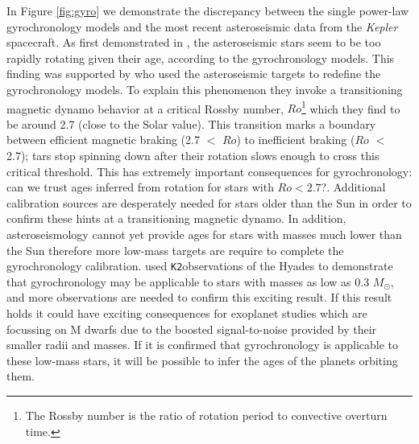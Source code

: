 \documentclass[12pt]{article}
\newcommand{\Kepler}{\textsl{Kepler}\xspace}
\newcommand{\ktwo}{{\tt K2}}
\begin{document}
In Figure \ref{fig:gyro} we demonstrate the discrepancy between the single
power-law gyrochronology models and the most recent asteroseismic data from
the \Kepler spacecraft.
As first demonstrated in \citet{angus2015}, the asteroseismic stars seem to be
too rapidly rotating given their age, according to the gyrochronology models.
This finding was supported by \citet{Vansaders2016} who used the \kepler
asteroseismic targets to redefine the gyrochronology models.
To explain this phenomenon they invoke a transitioning magnetic dynamo
behavior at a critical Rossby number, $Ro$\footnote{The Rossby number is the
ratio of rotation period to convective overturn time.} which they find to be
around 2.7 (close to the Solar value).
This transition marks a boundary between efficient magnetic braking (2.7 $<$
$Ro$) to inefficient braking ($Ro$ $<$ 2.7); tars stop spinning down after
their rotation slows enough to cross this critical threshold.
This has extremely important consequences for gyrochronology: can we trust
ages inferred from rotation for stars with $Ro < 2.7$?.
Additional calibration sources are desperately needed for stars older than the
Sun in order to confirm these hints at a transitioning magnetic dynamo.
In addition, asteroseismology cannot yet provide ages for stars with masses
much lower than the Sun therefore more low-mass targets are require to
complete the gyrochronology calibration.
\citet{Douglas2017} used \ktwo observations of the Hyades to demonstrate that
gyrochronology may be applicable to stars with masses as low as 0.3 $M_\odot$,
and more observations are needed to confirm this exciting result.
If this result holds it could have exciting consequences for exoplanet studies
which are focussing on M dwarfs due to the boosted signal-to-noise provided by
their smaller radii and masses.
If it is confirmed that gyrochronology is applicable to these low-mass stars,
it will be possible to infer the ages of the planets orbiting them.


\end{document}
